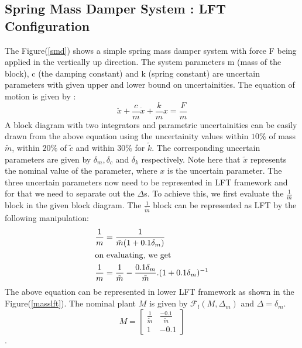 \documentclass[a4paper,12pt]{article}
\begin{document}
			\subsection{Spring Mass Damper System : LFT Configuration} The Figure(\ref{smd}) shows a simple spring mass damper system with force F being applied in the vertically up direction. The system parameters m (mass of the block), c (the damping constant) and k (spring constant) are uncertain parameters with given upper and lower bound on uncertainities. The equation of motion is given by :
				\begin{equation}
					\ddot{x} + \frac{c}{m}\dot{x}+\frac{k}{m}x = \frac{F}{m}
				\end{equation}
				A block diagram with two integrators and parametric uncertainities can be easily drawn from the above equation using the uncertainity values within $10\%$ of mass $\tilde{m}$, within $20\%$ of $\tilde{c}$ and within $30\%$ for $\tilde{k}$. The corresponding uncertain parameters are given by $\delta_{m},\delta_{c}$ and $\delta_{k}$ respectively. Note here that $\tilde{x}$ represents the nominal value of the parameter, where $x$ is the uncertain parameter. The three uncertain parameters now need to be represented in LFT framework and for that we need to separate out the $\Delta$s. To achieve this, we first evaluate the $\frac{1}{m}$ block in the given block diagram. The $\frac{1}{\tilde{m}}$ block can be represented as LFT by the following manipulation:
				\begin{align}
					\frac{1}{m} &= \frac{1}{\tilde{m}(1+0.1\delta_{m})}\\
					\intertext{on evaluating, we get}
					\frac{1}{m} &= \frac{1}{\tilde{m}} - \frac{0.1\delta_{m}}{\tilde{m}}. (1+0.1\delta_{m})^{-1}
				\end{align}
				The above equation can be represented in lower LFT framework as shown in the Figure(\ref{masslft}). The nominal plant $M$ is given by $\mathscr{F}_{l}(M,\Delta_{m})$ and $\Delta = \delta_{m}$.
				\[M=
				\begin{bmatrix}
					\frac{1}{\tilde{m}} & \frac{-0.1}{\tilde{m}} \\
					1 & -0.1
				\end{bmatrix}
				\].
				
\end{document}
